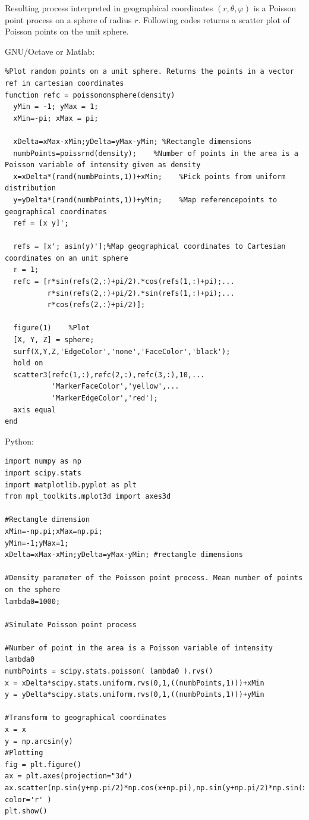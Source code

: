 \documentclass{article}
\begin{document}
Resulting process interpreted in geographical coordinates $(r,\theta,\varphi)$ is a Poisson point process on a sphere of radius $r$.  Following codes returns a scatter plot of Poisson points on the unit sphere.



GNU/Octave or Matlab:
\begin{verbatim}
%Plot random points on a unit sphere. Returns the points in a vector ref in cartesian coordinates
function refc = poissononsphere(density)
  yMin = -1; yMax = 1;
  xMin=-pi; xMax = pi;
  
  xDelta=xMax-xMin;yDelta=yMax-yMin; %Rectangle dimensions
  numbPoints=poissrnd(density);    %Number of points in the area is a Poisson variable of intensity given as density
  x=xDelta*(rand(numbPoints,1))+xMin;    %Pick points from uniform distribution
  y=yDelta*(rand(numbPoints,1))+yMin;    %Map referencepoints to geographical coordinates
  ref = [x y]';

  refs = [x'; asin(y)'];%Map geographical coordinates to Cartesian coordinates on an unit sphere
  r = 1;
  refc = [r*sin(refs(2,:)+pi/2).*cos(refs(1,:)+pi);...
          r*sin(refs(2,:)+pi/2).*sin(refs(1,:)+pi);...
          r*cos(refs(2,:)+pi/2)];

  figure(1)    %Plot
  [X, Y, Z] = sphere;
  surf(X,Y,Z,'EdgeColor','none','FaceColor','black');
  hold on
  scatter3(refc(1,:),refc(2,:),refc(3,:),10,...
           'MarkerFaceColor','yellow',...
           'MarkerEdgeColor','red');
  axis equal
end
\end{verbatim}

Python:

\begin{verbatim}
import numpy as np
import scipy.stats
import matplotlib.pyplot as plt
from mpl_toolkits.mplot3d import axes3d

#Rectangle dimension
xMin=-np.pi;xMax=np.pi;
yMin=-1;yMax=1;
xDelta=xMax-xMin;yDelta=yMax-yMin; #rectangle dimensions

#Density parameter of the Poisson point process. Mean number of points on the sphere
lambda0=1000; 

#Simulate Poisson point process

#Number of point in the area is a Poisson variable of intensity lambda0
numbPoints = scipy.stats.poisson( lambda0 ).rvs()
x = xDelta*scipy.stats.uniform.rvs(0,1,((numbPoints,1)))+xMin
y = yDelta*scipy.stats.uniform.rvs(0,1,((numbPoints,1)))+yMin

#Transform to geographical coordinates
x = x
y = np.arcsin(y)
#Plotting
fig = plt.figure()
ax = plt.axes(projection="3d")
ax.scatter(np.sin(y+np.pi/2)*np.cos(x+np.pi),np.sin(y+np.pi/2)*np.sin(x+np.pi),np.cos(y+np.pi/2), color='r' )
plt.show()
  
\end{verbatim}
\end{document}
